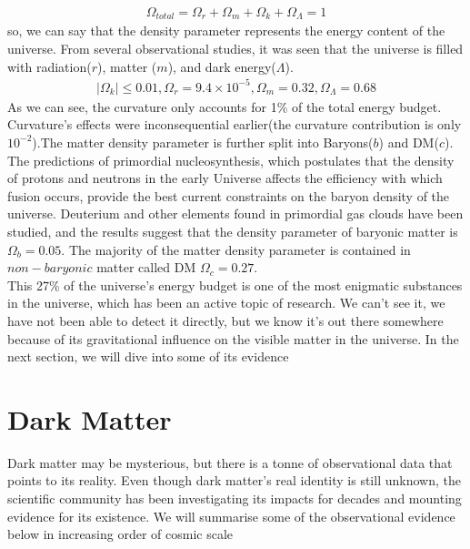 \begin{align}
    \Omega_{total} = \Omega_{r} + \Omega_{m} + \Omega_{k} +\Omega_{\Lambda} = 1 \label{1.39}
\end{align}
so, we can say that the density parameter represents the energy content of the universe. From several observational studies, it was seen that the universe is filled with radiation($r$), matter ($m$), and dark energy($\Lambda$).
\begin{align}
    |\Omega_k| \leq 0.01 , \Omega_r = 9.4 \times 10^{-5} , \Omega_m = 0.32 , \Omega_{\Lambda} =0.68 \label{1.40}
\end{align}
As we can see, the curvature only accounts for 1\% of the total energy budget. Curvature's effects were inconsequential earlier(the curvature contribution is only $10^{-2}$).The matter density parameter is further split into Baryons($b$) and DM($c$).\\
\hspace{0.5cm}The predictions of primordial nucleosynthesis, which postulates that the density of protons and neutrons in the early Universe affects the efficiency with which fusion occurs, provide the best current constraints on the baryon density of the universe. Deuterium and other elements found in primordial gas clouds have been studied, and the results suggest that the density parameter of baryonic matter is $\Omega_{b} = 0.05$. 
The majority of the matter density parameter is contained in $non-baryonic$ matter called DM $\Omega_{c} = 0.27$.\\
\hspace{0.5cm}This 27\% of the universe's energy budget is one of the most enigmatic substances in the universe, which has been an active topic of research. 
We can't see it, we have not been able to detect it directly, but we know it's out there somewhere because of its gravitational influence on the visible matter in the universe. In the next section, we will dive into some of its evidence

\section{Dark Matter}
\hspace{0.5cm}Dark matter may be mysterious, but there is a tonne of observational data that points to its reality. Even though dark matter's real identity is still unknown, the scientific community has been investigating its impacts for decades and mounting evidence for its existence. We will summarise some of the observational evidence below in increasing order of cosmic scale 


